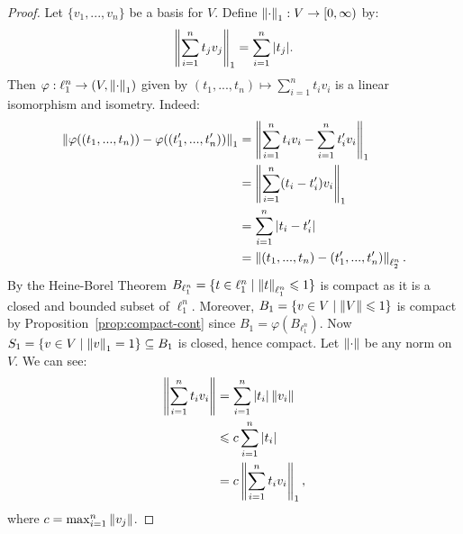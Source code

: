         \begin{proof}
            Let $\{v_1,...,v_n\}$ be a basis for $V$. Define $\left\lVert \cdot \right\rVert_1 : V \rightarrow [0,\infty)$ by:
                \begin{equation*}
                \begin{split}
                    \left\lVert \sum_{i = 1}^n t_j v_j \right\rVert_1 = \sum_{i = 1}^n |t_j|.
                \end{split}
                \end{equation*}
            Then $\varphi:\ell_1^n \rightarrow (V,\left\lVert \cdot \right\rVert_1)$ given by $(t_1,...,t_n) \mapsto \sum_{i = 1}^n t_i v_i$ is a linear isomorphism and isometry. Indeed:
                \begin{equation*}
                \begin{split}
                    \left\lVert \varphi((t_1,...,t_n)) - \varphi((t_1',...,t_n')) \right\rVert_1
                    & = \left\lVert \sum_{i = 1}^n t_i v_i - \sum_{i = 1}^n t_i' v_i \right\rVert_1 \\
                    & = \left\lVert \sum_{i = 1}^n(t_i - t_i')v_i \right\rVert_1 \\
                    & = \sum_{i = 1}^n |t_i - t_i'| \\
                    & = \left\lVert (t_1,...,t_n) - (t_1',...,t_n') \right\rVert_{\ell_2^n}.
                \end{split}
                \end{equation*}
            By the Heine-Borel Theorem $B_{\ell_1^n} = \{t \in \ell_1^n \mid \left\lVert t \right\rVert_{\ell_1^n} \leqslant 1\}$ is compact as it is a closed and bounded subset of $\ell_1^n$. Moreover, $B_1 = \{v \in V \mid \left\lVert V \right\rVert \leqslant 1\}$ is compact by Proposition~\ref{prop:compact-cont} since $B_1 = \varphi(B_{\ell_1^n})$. Now $S_1 = \{v \in V \mid \left\lVert v \right\rVert_1 =1 \} \subseteq B_1$ is closed, hence compact. Let $\left\lVert \cdot \right\rVert$ be any norm on $V$. We can see:
                \begin{equation*}
                \begin{split}
                    \left\lVert \sum_{i = 1}^n t_i v_i \right\rVert
                    & = \sum_{i = 1}^n |t_i|\left\lVert v_i \right\rVert \\
                    & \leqslant c \sum_{i = 1}^n |t_i| \\
                    & = c \left\lVert \sum_{i = 1} ^n t_i v_i\right\rVert_1,
                \end{split}
                \end{equation*}
            where $c = \max_{i = 1}^n \left\lVert v_j \right\rVert$. 
            

\end{proof}
